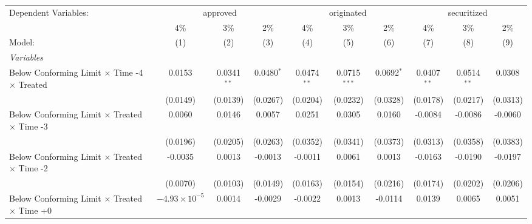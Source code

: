 \begingroup
\centering
\begin{tabular}{lccccccccc}
   \tabularnewline \midrule \midrule
   Dependent Variables: & \multicolumn{3}{c}{approved} & \multicolumn{3}{c}{originated} & \multicolumn{3}{c}{securitized}\\
                                                              & 4\%                    & 3\%            & 2\%           & 4\%           & 3\%            & 2\%          & 4\%            & 3\%            & 2\% \\    
   Model:                                                     & (1)                    & (2)            & (3)           & (4)           & (5)            & (6)          & (7)            & (8)            & (9)\\  
   \midrule
   \emph{Variables}\\
   Below Conforming Limit $\times$ Time -4 $\times$ Treated   & 0.0153                 & 0.0341$^{**}$  & 0.0480$^{*}$  & 0.0474$^{**}$ & 0.0715$^{***}$ & 0.0692$^{*}$ & 0.0407$^{**}$  & 0.0514$^{**}$  & 0.0308\\   
                                                              & (0.0149)               & (0.0139)       & (0.0267)      & (0.0204)      & (0.0232)       & (0.0328)     & (0.0178)       & (0.0217)       & (0.0313)\\   
   Below Conforming Limit $\times$ Treated $\times$ Time -3   & 0.0060                 & 0.0146         & 0.0057        & 0.0251        & 0.0305         & 0.0160       & -0.0084        & -0.0086        & -0.0060\\   
                                                              & (0.0196)               & (0.0205)       & (0.0263)      & (0.0352)      & (0.0341)       & (0.0373)     & (0.0313)       & (0.0358)       & (0.0383)\\   
   Below Conforming Limit $\times$ Treated $\times$ Time -2   & -0.0035                & 0.0013         & -0.0013       & -0.0011       & 0.0061         & 0.0013       & -0.0163        & -0.0190        & -0.0197\\   
                                                              & (0.0070)               & (0.0103)       & (0.0149)      & (0.0163)      & (0.0154)       & (0.0216)     & (0.0174)       & (0.0202)       & (0.0206)\\   
   Below Conforming Limit $\times$ Treated $\times$ Time +0   & $-4.93\times 10^{-5}$  & 0.0014         & -0.0029       & -0.0022       & 0.0013         & -0.0114      & 0.0139         & 0.0065         & 0.0051\\   

\end{tabular}

